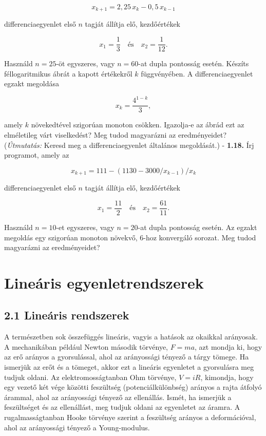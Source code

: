 \documentclass[
  magyar,
  11pt]{article}
\begin{document}
\[x_{k+1} = 2{,}25\,x_k - 0{,}5\,x_{k-1}\]

differenciaegyenlet első \(n\) tagját állítja elő, kezdőértékek

\[x_1 = \frac{1}{3} \quad \text{és} \quad x_2 = \frac{1}{12}.\]

Használd \(n = 25\)-öt egyszeres, vagy \(n = 60\)-at dupla pontosság
esetén. Készíts féllogaritmikus ábrát a kapott értékekről \(k\)
függvényében. A differenciaegyenlet egzakt megoldása

\[x_k = \frac{4^{1-k}}{3},\]

amely \(k\) növekedtével szigorúan monoton csökken. Igazolja-e az ábrád
ezt az elméletileg várt viselkedést? Meg tudod magyarázni az
eredményeidet? (\emph{Útmutatás:} Keresd meg a differenciaegyenlet
általános megoldását.) - \textbf{1.18.} Írj programot, amely az

\[x_{k+1} = 111 - (1130 - 3000/x_{k-1})/x_k\]

differenciaegyenlet első \(n\) tagját állítja elő, kezdőértékek

\[x_1 = \frac{11}{2} \quad \text{és} \quad x_2 = \frac{61}{11}.\]

Használd \(n = 10\)-et egyszeres, vagy \(n = 20\)-at dupla pontosság
esetén. Az egzakt megoldás egy szigorúan monoton növekvő, \(6\)-hoz
konvergáló sorozat. Meg tudod magyarázni az eredményeidet?

\section{Lineáris
egyenletrendszerek}\label{lineuxe1ris-egyenletrendszerek}

\subsection{2.1 Lineáris rendszerek}\label{lineuxe1ris-rendszerek}

A természetben sok összefüggés lineáris, vagyis a hatások az okaikkal
arányosak. A mechanikában például Newton második törvénye, \(F = ma\),
azt mondja ki, hogy az erő arányos a gyorsulással, ahol az arányossági
tényező a tárgy tömege. Ha ismerjük az erőt és a tömeget, akkor ezt a
lineáris egyenletet a gyorsulásra meg tudjuk oldani. Az
elektromosságtanban Ohm törvénye, \(V = iR\), kimondja, hogy egy vezető
két vége közötti feszültség (potenciálkülönbség) arányos a rajta átfolyó
árammal, ahol az arányossági tényező az ellenállás. Ismét, ha ismerjük a
feszültséget és az ellenállást, meg tudjuk oldani az egyenletet az
áramra. A rugalmasságtanban Hooke törvénye szerint a feszültség arányos
a deformációval, ahol az arányossági tényező a Young-modulus.
\end{document}
